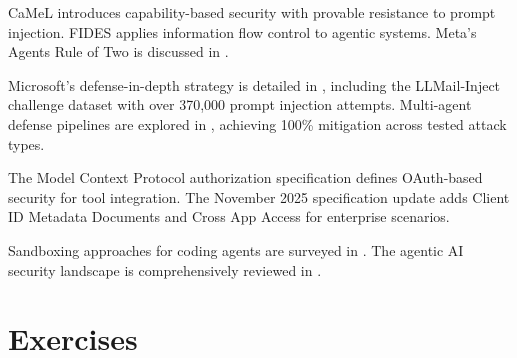 CaMeL \cite{camel2025} introduces capability-based security with provable resistance to prompt injection. FIDES \cite{fides2025} applies information flow control to agentic systems. Meta's Agents Rule of Two is discussed in \cite{ruleoftwo2025}.

Microsoft's defense-in-depth strategy is detailed in \cite{msdefense2025}, including the LLMail-Inject challenge dataset with over 370,000 prompt injection attempts. Multi-agent defense pipelines are explored in \cite{multiagentdefense2025}, achieving 100\% mitigation across tested attack types.

The Model Context Protocol authorization specification \cite{mcpauth2025} defines OAuth-based security for tool integration. The November 2025 specification update adds Client ID Metadata Documents and Cross App Access for enterprise scenarios.

Sandboxing approaches for coding agents are surveyed in \cite{sandbox2025}. The agentic AI security landscape is comprehensively reviewed in \cite{agenticsecurity2025}.

\section*{Exercises}

